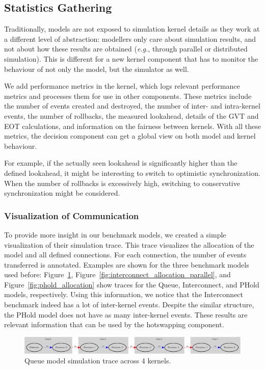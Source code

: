 \subsection{Statistics Gathering}
Traditionally, models are not exposed to simulation kernel details as they work at a different level of abstraction:
modellers only care about simulation results, and not about how these results are obtained (\textit{e.g.}, through parallel or distributed simulation).
This is different for a new kernel component that has to monitor the behaviour of not only the model, but the simulator as well.

We add performance metrics in the kernel, which logs relevant performance metrics and processes them for use in other components.
These metrics include the number of events created and destroyed, the number of inter- and intra-kernel events, the number of rollbacks, the measured lookahead, details of the GVT and EOT calculations, and information on the fairness between kernels.
With all these metrics, the decision component can get a global view on both model and kernel behaviour.

For example, if the actually seen lookahead is significantly higher than the defined lookahead, it might be interesting to switch to optimistic synchronization.
When the number of rollbacks is excessively high, switching to conservative synchronization might be considered.

\subsubsection{Visualization of Communication}
To provide more insight in our benchmark models, we created a simple visualization of their simulation trace.
This trace visualizes the allocation of the model and all defined connections.
For each connection, the number of events transferred is annotated.
Examples are shown for the three benchmark models used before: Figure~\ref{fig:Queue_allocation}, Figure~\ref{fig:interconnect_allocation_parallel}, and Figure~\ref{fig:phold_allocation} show traces for the Queue, Interconnect, and PHold models, respectively.
Using this information, we notice that the Interconnect benchmark indeed has a lot of inter-kernel events.
Despite the similar structure, the PHold model does not have as many inter-kernel events.
These results are relevant information that can be used by the hotswapping component.

\begin{figure}
    \center
    \includegraphics[width=\textwidth ]{fig/queue_allocation.eps}
    \caption{Queue model simulation trace across 4 kernels.}
    \label{fig:Queue_allocation}
\end{figure}

